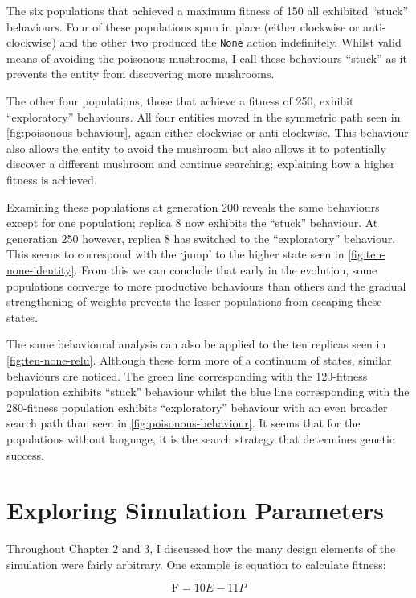 \documentclass[12pt,a4paper]{report}
\begin{document}
The six populations that achieved a maximum fitness of 150 all exhibited ``stuck'' behaviours. Four of these populations spun in place (either clockwise or anti-clockwise) and the other two produced the \verb~None~ action indefinitely. Whilst valid means of avoiding the poisonous mushrooms, I call these behaviours ``stuck'' as it prevents the entity from discovering more mushrooms.

The other four populations, those that achieve a fitness of 250, exhibit ``exploratory'' behaviours. All four entities moved in the symmetric path seen in \cref{fig:poisonous-behaviour}, again either clockwise or anti-clockwise. This behaviour also allows the entity to avoid the mushroom but also allows it to potentially discover a different mushroom and continue searching; explaining how a higher fitness is achieved. 

Examining these populations at generation 200 reveals the same behaviours except for one population; replica 8 now exhibits the ``stuck'' behaviour. At generation 250 however, replica 8 has switched to the ``exploratory'' behaviour. This seems to correspond with the `jump' to the higher state seen in \cref{fig:ten-none-identity}. From this we can conclude that early in the evolution, some populations converge to more productive behaviours than others and the gradual strengthening of weights prevents the lesser populations from escaping these states.

The same behavioural analysis can also be applied to the ten replicas seen in \cref{fig:ten-none-relu}. Although these form more of a continuum of states, similar behaviours are noticed. The green line corresponding with the 120-fitness population exhibits ``stuck'' behaviour whilst the blue line corresponding with the 280-fitness population exhibits ``exploratory'' behaviour with an even broader search path than seen in \cref{fig:poisonous-behaviour}. It seems that for the populations without language, it is the search strategy that determines genetic success.

\section{Exploring Simulation Parameters}\label{section:simulation-parameters}

Throughout Chapter 2 and 3, I discussed how the many design elements of the simulation were fairly arbitrary. One example is equation to calculate fitness:

$$\mathrm{F} = 10 E - 11 P$$
\end{document}
